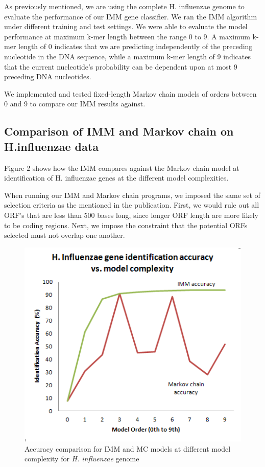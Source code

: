 \documentclass[11pt,letterpaper]{article}
\begin{document}
As previously mentioned, we are using the complete H. influenzae genome to evaluate the performance of our IMM gene classifier. We ran the IMM algorithm under different training and test settings. We were able to evaluate the model performance at maximum k-mer length between the range 0 to 9. A maximum k-mer length of 0 indicates that we are predicting independently of the preceding nucleotide in the DNA sequence, while a maximum k-mer length of 9 indicates that the current nucleotide’s probability can be dependent upon at most 9 preceding DNA nucleotides. 

We implemented and tested fixed-length Markov chain models of orders between 0 and 9 to compare our IMM results against.

\subsection{Comparison of IMM and Markov chain on H.influenzae data}
Figure 2 shows how the IMM compares against the Markov chain model at identification of H. influenzae genes at the different model complexities.

When running our IMM and Markov chain programs, we imposed the same set of selection criteria as the mentioned in the publication. First, we would rule out all ORF’s that are less than 500 bases long, since longer ORF length are more likely to be coding regions. Next, we impose the constraint that the potential ORFs selected must not overlap one another. 

\begin{figure}
	\begin{center}
		\includegraphics[scale=0.8]{plots/accuracy_vs_model_complexity.png}
	\end{center}
	\caption{\label{font-table} Accuracy comparison for IMM and MC models at different model complexity for \emph{H. influenzae} genome}
\end{figure}
\end{document}
